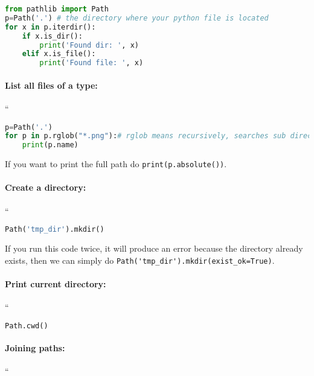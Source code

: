 \documentclass[graybox,sectrefs,envcountresetchap,open=right,final]{svmonodo}
\begin{document}
\begin{lstlisting}[language=python,style=blue1bar]
from pathlib import Path
p=Path('.') # the directory where your python file is located
for x in p.iterdir():
    if x.is_dir():
        print('Found dir: ', x)
    elif x.is_file():
        print('Found file: ', x)

\end{lstlisting}


\paragraph{List all files of a type:}
``




\begin{lstlisting}[language=python,style=blue1bar]
p=Path('.')
for p in p.rglob("*.png"):# rglob means recursively, searches sub directories
    print(p.name)

\end{lstlisting}

If you want to print the full path do \texttt{print(p.absolute())}.

\paragraph{Create a directory:}
``


\begin{lstlisting}[language=python,style=blue1bar]
Path('tmp_dir').mkdir()

\end{lstlisting}

If you run this code twice, it will produce an error because the directory already exists, then we can simply do \Verb!Path('tmp_dir').mkdir(exist_ok=True)!.

\paragraph{Print current directory:}
``


\begin{lstlisting}[language=python,style=blue1bar]
Path.cwd()

\end{lstlisting}


\paragraph{Joining paths:}
``
\end{document}
